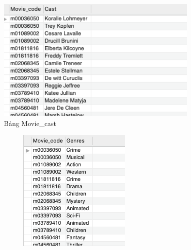 \begin{figure}[H]
    \centering
    \includegraphics[width=10cm]{images/CAST.png}
    \caption{Bảng Movie\_cast}
\end{figure}

\begin{figure}[H]
\begin{subfigure}{.5\textwidth}
  \centering
  \includegraphics[width=.8\linewidth]{images/GENRES.png}
\end{subfigure}%
\begin{subfigure}{.5\textwidth}
  \centering

\end{subfigure}
\end{figure}
